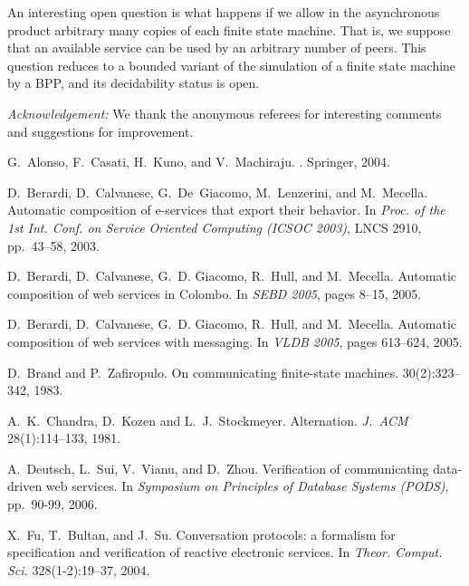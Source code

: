 \documentclass{LMCS}
\theoremstyle{plain}\newtheorem{remark}{Remark}
\theoremstyle{plain}\newtheorem{lemma}[thm]{Lemma}
\begin{document}
An interesting open question  is what happens if we allow in the
asynchronous product arbitrary many copies of each finite state
machine. That is, we suppose that an available service can be used
by an arbitrary number of peers. This question reduces to a bounded
variant  of the simulation of a finite state machine by a BPP, and its
decidability status is open.

\medskip

\emph{Acknowledgement:} We thank the anonymous referees  for interesting
comments and suggestions for improvement.




\begin{thebibliography}{1}

G.~Alonso, F.~Casati, H.~Kuno, and V.~Machiraju.
.
\newblock Springer, 2004.

D.~Berardi, D.~Calvanese, G.~De~Giacomo, M.~Lenzerini, and M.~Mecella.
\newblock Automatic composition of e-services that export their behavior.
\newblock In {\em Proc. of the 1st Int. Conf. on Service Oriented Computing
  (ICSOC 2003)}, LNCS 2910, pp.~43--58, 2003.

D.~Berardi, D.~Calvanese, G.~D. Giacomo, R.~Hull, and M.~Mecella.
\newblock Automatic composition of web services in Colombo.
\newblock In {\em SEBD 2005}, pages 8--15, 2005.

D.~Berardi, D.~Calvanese, G.~D. Giacomo, R.~Hull, and M.~Mecella.
\newblock Automatic composition of web services with messaging.
\newblock In {\em VLDB 2005}, pages 613--624, 2005.

D.~Brand and P.~Zafiropulo.
\newblock On communicating finite-state machines.
 30(2):323--342, 1983.

A.~K.~Chandra, D.~Kozen and L.~J.~Stockmeyer.
\newblock Alternation. 
\newblock \emph{J.\ ACM} 28(1):114--133, 1981.

A.~Deutsch, L.~Sui, V.~Vianu, and D.~Zhou.
\newblock Verification of communicating data-driven web services.
\newblock In {\em Symposium on Principles of Database Systems (PODS)},
pp.~90-99, 2006.

X.~Fu, T.~Bultan, and J.~Su.
\newblock Conversation protocols: a formalism for specification and 
verification of reactive electronic services. 
\newblock In \emph{Theor. Comput. Sci.} 328(1-2):19--37, 2004.


\end{thebibliography}
\end{document}
